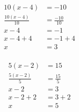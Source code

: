 \documentclass[12pt]{article}
\newcounter{minipagecount}
\begin{document}
\begin{multicols}{2}
\begin{minipage}[t]{0.45\textwidth}
    \raggedright %
    \begin{align*} %
        10(x - 4) &= -10\\
        \frac{10(x-4)}{10} &= \frac{-10}{10}\\
        x - 4 &= -1\\
        x - 4 + 4 &= -1 + 4\\
        x &= 3\\
    \end{align*}
\end{minipage} %
\noindent{(\theminipagecount)}\hspace{0.1mm} %
\begin{minipage}[t]{0.45\textwidth} %
    \vspace{-26pt}  %
    \raggedright %
    \begin{align*} %
        5(x - 2) &= 15\\
        \frac{5(x-2)}{5} &= \frac{15}{5}\\
        x - 2 &= 3\\
        x - 2 + 2 &= 3 + 2\\
        x &= 5\\
    \end{align*}
\end{minipage} %
\noindent{(\theminipagecount)}\hspace{0.1mm} %
\begin{minipage}[t]{0.45\textwidth} %
    \vspace{-26pt}  %

\end{minipage}
\end{multicols}
\end{document}
